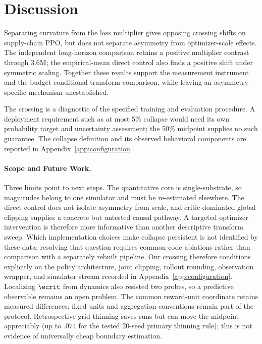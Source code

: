 \section{Discussion}
\label{sec:discussion}

Separating curvature from the loss multiplier gives opposing crossing shifts on supply-chain PPO, but does not separate asymmetry from optimizer-scale effects. The independent long-horizon comparison retains a positive multiplier contrast through 3.6M; the empirical-mean direct control also finds a positive shift under symmetric scaling. Together these results support the measurement instrument and the budget-conditional transform comparison, while leaving an asymmetry-specific mechanism unestablished.

The crossing is a diagnostic of the specified training and evaluation procedure.
A deployment requirement such as at most 5\% collapse would need its own
probability target and uncertainty assessment; the 50\% midpoint supplies no
such guarantee. The collapse definition and its observed behavioral components are reported in
Appendix~\ref{app:configuration}.

\paragraph{Scope and Future Work.}
Three limits point to next steps. The quantitative core is single-substrate, so magnitudes belong to
one simulator and must be re-estimated elsewhere. The direct control does not isolate asymmetry from
scale, and critic-dominated global clipping supplies a concrete but untested causal pathway. A targeted
optimizer intervention is therefore more informative than another descriptive transform sweep.
Which implementation choices make collapse persistent is not identified by these data; resolving that
question requires common-code ablations rather than comparison with a separately rebuilt pipeline. Our
crossing therefore conditions explicitly on the policy architecture, joint clipping, rollout rounding,
observation wrapper, and simulator stream recorded in Appendix~\ref{app:configuration}.
Localizing $\wcrit$ from dynamics also resisted two probes, so a predictive observable remains an open
problem. The common reward-unit coordinate retains measured differences; fixed units and aggregation
conventions remain part of the protocol. Retrospective grid thinning saves runs but can move
the midpoint appreciably (up to .074 for the tested 20-seed primary thinning rule);
this is not evidence of universally cheap boundary estimation.

